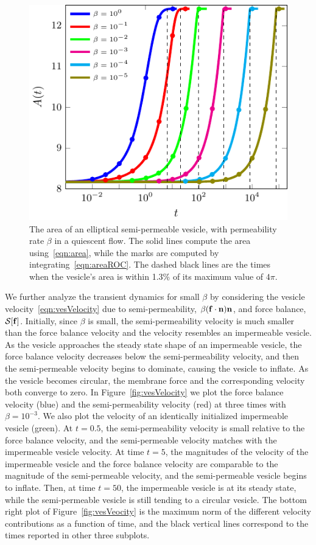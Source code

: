 \documentclass[9pt,twocolumn,twoside,lineno]{pnas-new}
\newif\ifTikz
\begin{document}
\begin{figure}[htp]
  \centering
%  
  \includegraphics[width=0.8\linewidth]{figures/ellipseArea}
  \caption{\label{fig:ellipseArea} The area of an elliptical
  semi-permeable vesicle, with permeability rate $\beta$ in a quiescent
  flow. The solid lines compute the area using~\eqref{eqn:area}, while
  the marks are computed by integrating~\eqref{eqn:areaROC}. The dashed
  black lines are the times when the vesicle's area is within 1.3\% of
  its maximum value of $4\pi$.}
\end{figure}

We further analyze the transient dynamics for small $\beta$ by
considering the vesicle velocity~\eqref{eqn:vesVelocity} due to
semi-permeability, $\beta(\mathbf{f} \cdot \mathbf{n})\mathbf{n}$, and force balance,
$\mathcal{S}[\mathbf{f}]$. Initially, since $\beta$ is small, the semi-permeability
velocity is much smaller than the force balance velocity and the
velocity resembles an impermeable vesicle. As the
vesicle approaches the steady state shape of an impermeable vesicle, the
force balance velocity decreases below the semi-permeability velocity,
and then the semi-permeable velocity begins to dominate, causing the
vesicle to inflate. As the vesicle becomes circular, the
membrane force and the corresponding velocity both converge to
zero. In Figure~\ref{fig:vesVelocity} we plot the force balance velocity
(blue) and the semi-permeability velocity (red) at three times with
$\beta=10^{-3}$. We also plot the velocity of an identically initialized
impermeable vesicle (green). At $t=0.5$, the semi-permeability velocity is
small relative to the force balance velocity, and the semi-permeable
velocity matches with the impermeable vesicle velocity. At time $t=5$,
the magnitudes of the velocity of the impermeable vesicle and the force
balance velocity are comparable to the magnitude of the
semi-permeable velocity, and the semi-permeable vesicle begins to
inflate. Then, at time $t=50$, the impermeable vesicle is at its steady
state, while the semi-permeable vesicle is still tending to a circular
vesicle. The bottom right plot of Figure~\ref{fig:vesVeocity} is the
maximum norm of the different velocity contributions as a function of
time, and the black vertical lines correspond to the times reported in
other three subplots.
\end{document}
